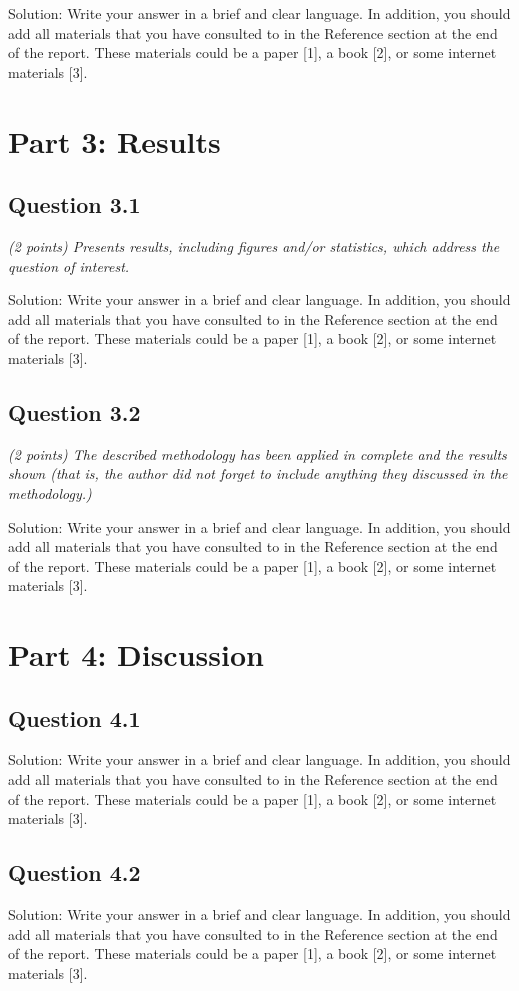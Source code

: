 \documentclass[12pt]{article}
\begin{document}
Solution: Write your answer in a brief and clear language. In addition, you should add all materials that you have consulted to in the Reference section at the end of the report. These materials could be a paper [1], a book [2], or some internet materials [3].

\section{Part 3: Results}

\subsection{Question 3.1}
\textit{(2 points) Presents results, including figures and/or statistics, which address the question of interest.}

Solution: Write your answer in a brief and clear language. In addition, you should add all materials that you have consulted to in the Reference section at the end of the report. These materials could be a paper [1], a book [2], or some internet materials [3].

\subsection{Question 3.2}
\textit{(2 points) The described methodology has been applied in complete and the results shown (that is, the author did not forget to include anything they discussed in the methodology.) }

Solution: Write your answer in a brief and clear language. In addition, you should add all materials that you have consulted to in the Reference section at the end of the report. These materials could be a paper [1], a book [2], or some internet materials [3].

\section{Part 4: Discussion}
\subsection{Question 4.1}
Solution: Write your answer in a brief and clear language. In addition, you should add all materials that you have consulted to in the Reference section at the end of the report. These materials could be a paper [1], a book [2], or some internet materials [3].

\subsection{Question 4.2}
Solution: Write your answer in a brief and clear language. In addition, you should add all materials that you have consulted to in the Reference section at the end of the report. These materials could be a paper [1], a book [2], or some internet materials [3].
\end{document}
